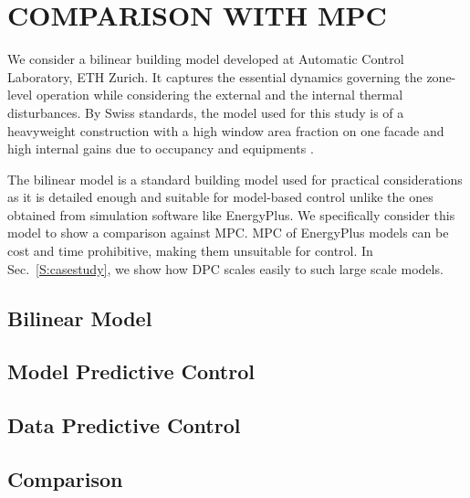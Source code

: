 \section{COMPARISON WITH MPC}
\label{S:proof}

We consider a bilinear building model developed at Automatic Control Laboratory, ETH Zurich.
It captures the essential dynamics governing the zone-level operation while considering the external and the internal thermal disturbances. 
By Swiss standards, the model used for this study is of a heavyweight construction with a high window area fraction on one facade and high internal gains due to occupancy and equipments \cite{Gyalistras2010a}. 

The bilinear model is a standard building model used for practical considerations \cite{Ma2015,Oldewurtel2011,Oldewurtel2012} as it is detailed enough and suitable for model-based control unlike the ones obtained from simulation software like EnergyPlus. We specifically consider this model to show a comparison against MPC. 
MPC of EnergyPlus models can be cost and time prohibitive, making them unsuitable for control. In Sec.~\ref{S:casestudy}, we show how DPC scales easily to such large scale models.

\subsection{Bilinear Model}
\label{SS:model}


\subsection{Model Predictive Control}
\label{SS:mpc}


\subsection{Data Predictive Control}
\label{SS:dpc}


\subsection{Comparison}
\label{SS:comp}

